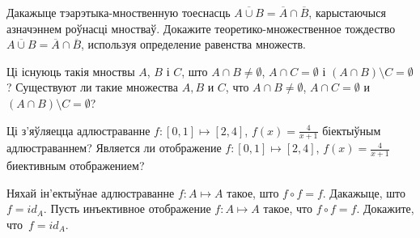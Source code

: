 \begin{problemList}
\bigskip

\problemItemSimple
{Дакажыце тэарэтыка-мноственную тоеснасць $\overline{A \cup B} = \overline{A} \cap \overline{B}$,
карыстаючыся азначэннем роўнасці мностваў.}
{Докажите теоретико-множественное тождество $\overline{A \cup B} = \overline{A} \cap \overline{B}$,
используя определение равенства множеств.}

\bigskip

\problemItemSimple
{Ці існуюць такія мноствы $A$, $B$ і $C$, што
$A \cap B \neq \emptyset$, $A \cap C = \emptyset$ і $(A \cap B) \setminus C = \emptyset$?}
{Существуют ли такие множества $A, B$ и $C$, что
$A \cap B \neq \emptyset$, $A \cap C = \emptyset$ и $(A \cap B) \setminus C = \emptyset$?}

\bigskip

\problemItemSimple
{Ці з'яўляецца адлюстраванне $f: [0, 1] \mapsto [2, 4]$, $f(x) = \frac{4}{x + 1}$ біектыўным адлюстраваннем?}
{Является ли отображение $f: [0, 1] \mapsto [2, 4]$, $f(x) = \frac{4}{x + 1}$ биективным отображением?}

\bigskip

\problemItemSimple
{Няхай ін'ектыўнае адлюстраванне $f: A \mapsto A$ такое, што $f \circ f = f$. Дакажыце, што~$f = id_{A}$.}
{Пусть инъективное отображение $f: A \mapsto A$ такое, что $f \circ f = f$. Докажите, что~$f = id_{A}$.}

\end{problemList}



